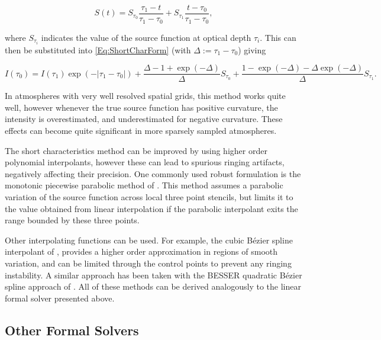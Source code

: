 \begin{equation}
    S(t) = S_{\tau_0} \frac{\tau_1-t}{\tau_1-\tau_0} + S_{\tau_1} \frac{t-\tau_0}{\tau_1-\tau_0},
\end{equation}

where $S_{\tau_i}$ indicates the value of the source function at optical depth $\tau_i$.
This can then be substituted into \eqref{Eq:ShortCharForm} (with $\Delta := \tau_1 - \tau_0$) giving

\begin{equation}
    I(\tau_0) = I(\tau_1) \exp(- |\tau_1 - \tau_0|) +
    \frac{\Delta - 1 + \exp(-\Delta)}{\Delta} S_{\tau_0} +
    \frac{1 - \exp(-\Delta) - \Delta\exp(-\Delta)}{\Delta} S_{\tau_1}.
\end{equation}

In atmospheres with very well resolved spatial grids, this method works quite well, however whenever the true source function has positive curvature, the intensity is overestimated, and underestimated for negative curvature. These effects can become quite significant in more sparsely sampled atmospheres.

The short characteristics method can be improved by using higher order polynomial interpolants, however these can lead to spurious ringing artifacts, negatively affecting their precision. One commonly used robust formulation is the monotonic piecewise parabolic method of \citet{Auer1994}. This method assumes a parabolic variation of the source function across local three point stencils, but limits it to the value obtained from linear interpolation if the parabolic interpolant exits the range bounded by these three points.

Other interpolating functions can be used. For example, the cubic Bézier spline interpolant of \citet{DelaCruzRodriguez2013}, provides a higher order approximation in regions of smooth variation, and can be limited through the control points to prevent any ringing instability. A similar approach has been taken with the BESSER quadratic Bézier spline approach of \citet{Stepan2013}.
All of these methods can be derived analogously to the linear formal solver presented above.

\subsection{Other Formal Solvers}

